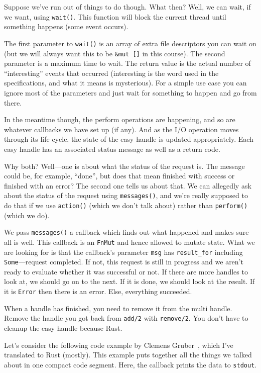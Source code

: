\documentclass[a4paper]{report}
\begin{document}
Suppose we've run out of things to do though. What then? Well, we can wait, if we want, using \texttt{wait()}. This function will block the current thread until something happens (some event occurs).

The first parameter to \texttt{wait()} is an array of extra file descriptors you can wait on (but we will always want this to be \texttt{\&mut []} in this course). The second parameter is a maximum time to wait. The return value is the actual number of ``interesting'' events that occurred (interesting is the word used in the specifications, and what it means is mysterious). For a simple use case you can ignore most of the parameters and just wait for something to happen and go from there.

In the meantime though, the perform operations are happening, and so are whatever callbacks we have set up (if any). And as the I/O operation moves through its life cycle, the state of the easy handle is updated appropriately. Each easy handle has an associated status message as well as a return code.

Why both? Well---one is about what the status of the request is. The message could be, for example, ``done'', but does that mean finished with success or finished with an error? The second one tells us about that. We can allegedly ask about the status of the request using \texttt{messages()}, and we're really supposed to do that if we use \texttt{action()} (which we don't talk about) rather than \texttt{perform()} (which we do).

We pass \texttt{messages()} a callback which finds out what happened and makes sure all is well. This callback is an \texttt{FnMut} and hence allowed to mutate state. What we are looking for is that the callback's parameter \texttt{msg} has \texttt{result\_for} including \texttt{Some}---request completed. If not, this request is still in progress and we aren't ready to evaluate whether it was successful or not. If there are more handles to look at, we should go on to the next. If it is done, we should look at the result. If it is \texttt{Error} then there is an error. Else, everything succeeded.

When a handle has finished, you need to remove it from the multi handle. Remove the handle you got back from \texttt{add/2} with \texttt{remove/2}. You don't have to cleanup the easy handle because Rust.

Let's consider the following code example by Clemens Gruber~\cite{curlmulti}, which I've translated to Rust (mostly). This example puts together all the things we talked about in one compact code segment. Here, the callback prints the data to \texttt{stdout}.
\end{document}
